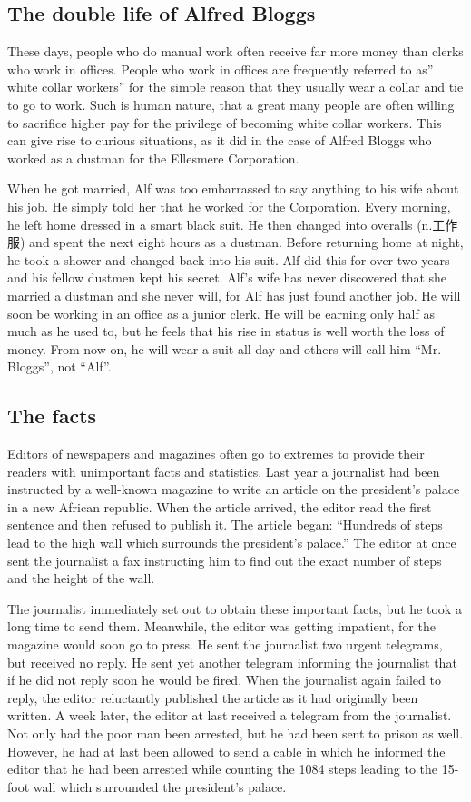 \documentclass[11pt]{article}
\begin{document}
\subsection{The double life of Alfred Bloggs}
\label{sec-1-4}

These days, people who do manual work often receive far more money than clerks who work in offices. People who work in offices are frequently referred to as'' white collar workers'' for the simple reason that they usually wear a collar and tie to go to work. Such is human nature, that a great many people are often willing to sacrifice higher pay for the privilege of becoming white collar workers. This can give rise to curious situations, as it did in the case of Alfred Bloggs who worked as a dustman for the Ellesmere Corporation.

When he got married, Alf was too embarrassed to say anything to his wife about his job. He simply told her that he worked for the Corporation. Every morning, he left home dressed in a smart black suit. He then changed into overalls (n.工作服) and spent the next eight hours as a dustman. Before returning home at night, he took a shower and changed back into his suit. Alf did this for over two years and his fellow dustmen kept his secret. Alf's wife has never discovered that she married a dustman and she never will, for Alf has just found another job. He will soon be working in an office as a junior clerk. He will be earning only half as much as he used to, but he feels that his rise in status is well worth the loss of money. From now on, he will wear a suit all day and others will call him ``Mr. Bloggs'', not ``Alf''.
\subsection{The facts}
\label{sec-1-5}

Editors of newspapers and magazines often go to extremes to provide their readers with unimportant facts and statistics. Last year a journalist had been instructed by a well-known magazine to write an article on the president's palace in a new African republic. When the article arrived, the editor read the first sentence and then refused to publish it. The article began: ``Hundreds of steps lead to the high wall which surrounds the president's palace.'' The editor at once sent the journalist a fax instructing him to find out the exact number of steps and the height of the wall.

The journalist immediately set out to obtain these important facts, but he took a long time to send them. Meanwhile, the editor was getting impatient, for the magazine would soon go to press. He sent the journalist two urgent telegrams, but received no reply. He sent yet another telegram informing the journalist that if he did not reply soon he would be fired. When the journalist again failed to reply, the editor reluctantly published the article as it had originally been written. A week later, the editor at last received a telegram from the journalist. Not only had the poor man been arrested, but he had been sent to prison as well. However, he had at last been allowed to send a cable in which he informed the editor that he had been arrested while counting the 1084 steps leading to the 15-foot wall which surrounded the president's palace.
\end{document}
